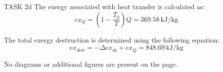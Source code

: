 TASK 2d  
The exergy associated with heat transfer is calculated as:  
\[
ex_Q = \left( 1 - \frac{T_0}{T} \right) Q = 369.58 \, \text{kJ/kg}
\]  

The total exergy destruction is determined using the following equation:  
\[
ex_{\text{dest}} = -\Delta ex_{\text{sh}} + ex_Q = 848.69 \, \text{kJ/kg}
\]  

No diagrams or additional figures are present on the page.
